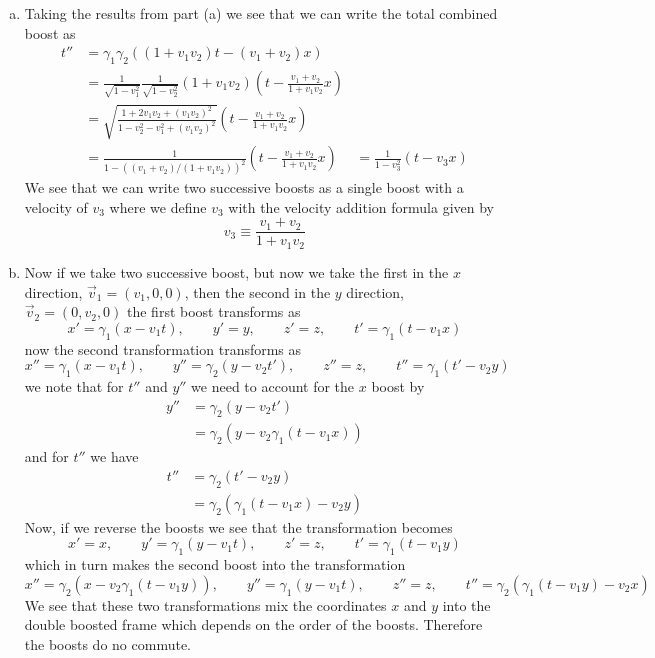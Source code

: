 \documentclass[11pt]{article}
\numberwithin{equation}{section}
\begin{document}
\begin{enumerate}[(a)]
\item
    Taking the results from part (a) we see that we can write the total combined boost as
    \begin{align*}
        t'' &= \gamma_1\gamma_2((1+v_1v_2)t-(v_1+v_2)x) \\
            &= \frac{1}{\sqrt{1-v_1^2}}\frac{1}{\sqrt{1-v_2^2}}(1+v_1v_2)\left(t-\frac{v_1+v_2}{1+v_1v_2}x\right) \\
            &= \sqrt{\frac{1+2v_1v_2+(v_1v_2)^2}{1-v_2^2-v_1^2+(v_1v_2)^2}}\left(t-\frac{v_1+v_2}{1+v_1v_2}x\right) \\
            &= \frac{1}{1-((v_1+v_2)/(1+v_1v_2))^2}\left(t-\frac{v_1+v_2}{1+v_1v_2}x\right) 
            &= \frac{1}{1-v_3^2}\left(t-v_3x\right) 
    \end{align*}
    We see that we can write two successive boosts as a single boost with a velocity of $v_3$ where we define $v_3$ with the velocity addition formula given by
    \begin{equation}
        v_3 \equiv \frac{v_1+v_2}{1+v_1v_2}
    \end{equation}

\item
    Now if we take two successive boost, but now we take the first in the $x$ direction, $\vec{v}_1=(v_1,0,0)$, then the second 
    in the $y$ direction, $\vec{v}_2 = (0,v_2,0)$ the first boost transforms as
    $$x' = \gamma_1(x-v_1t),\qquad y'=y,\qquad z'=z,\qquad t'=\gamma_1(t-v_1x)$$
    now the second transformation transforms as 
    $$x'' = \gamma_1(x-v_1t),\qquad y''=\gamma_2(y-v_2t'),\qquad z''=z,\qquad t''=\gamma_1(t'-v_2y)$$
    we note that for $t''$ and $y''$ we need to account for the $x$ boost by
    \begin{align*}
        y'' &= \gamma_2(y-v_2t')  \\
            &= \gamma_2(y-v_2\gamma_1(t-v_1x))  
    \end{align*}
    and for $t''$ we have
    \begin{align*}
        t'' &= \gamma_2(t'-v_2y)  \\
            &= \gamma_2(\gamma_1(t-v_1x)-v_2y)  
    \end{align*}
    Now, if we reverse the boosts we see that the transformation becomes
    $$x' = x,\qquad y'=\gamma_1(y-v_1t),\qquad z'=z,\qquad t'=\gamma_1(t-v_1y)$$
    which in turn makes the second boost into the transformation
    $$x'' = \gamma_2(x-v_2\gamma_1(t-v_1y)),\qquad y''=\gamma_1(y-v_1t),\qquad z''=z,\qquad t''=\gamma_2(\gamma_1(t-v_1y)-v_2x)$$
    We see that these two transformations mix the coordinates $x$ and $y$ into the double boosted frame which 
    depends on the order of the boosts. Therefore the boosts do no commute.


\end{enumerate}
\end{document}
